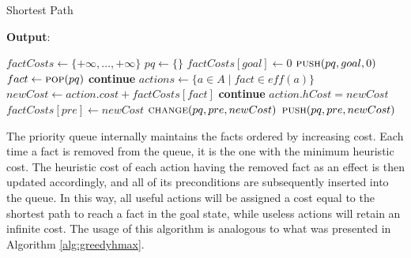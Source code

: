\begin{algorithm}
	\caption{Shortest Path}
	\label{alg:sp}
	\hspace*{0.5em} \textbf{Output}:
	\begin{algorithmic}[1]
		\State $factCosts \gets \{+\infty, \dots, +\infty\}$ 
		\State $pq\gets \{\}$ 
		\State $factCosts[goal] \gets 0$
		\State $\Call{push}{pq, goal, 0}$
		\EndFor
		\State $fact \gets \Call{pop}{pq}$ 
		\State \textbf{continue} 
		\EndIf
		\State $actions \gets \{a \in A \mid fact \in \textit{eff}\left(a\right)\}$
		\State $newCost \gets action.cost + factCosts[fact]$
		\State \textbf{continue}
		\EndIf
		\State $action.hCost = newCost$
		\State $factCosts[pre] \gets newCost$
		\State $\Call{change}{pq, pre, newCost}$
		\Else
		\State $\Call{push}{pq, pre, newCost}$
		\EndIf
		\EndIf
		\EndFor
		\EndFor
		\EndWhile
		\EndProcedure
	\end{algorithmic}
\end{algorithm}

The priority queue internally maintains the facts ordered by increasing cost.
Each time a fact is removed from the queue, it is the one with the minimum heuristic cost.
The heuristic cost of each action having the removed fact as an effect is then updated accordingly,
and all of its preconditions are subsequently inserted into the queue.
In this way, all useful actions will be assigned a cost equal to the shortest path to reach a fact in
the goal state, while useless actions will retain an infinite cost.
The usage of this algorithm is analogous to what was presented in Algorithm \ref{alg:greedyhmax}.

